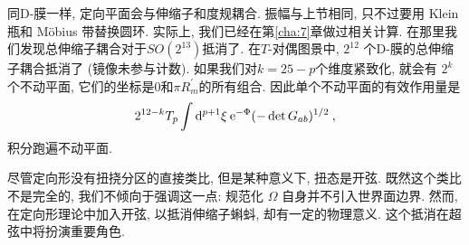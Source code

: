 同D-膜一样, 定向平面会与伸缩子和度规耦合. 振幅与上节相同, 只不过要用 Klein 瓶和 Möbius 带替换圆环. 
实际上, 我们已经在第\ref{cha:7}章做过相关计算. 在那里我们发现总伸缩子耦合对于$S O\left(2^{13}\right)$抵消了. 
在$T$-对偶图景中, $2^{12}$ 个D-膜的总伸缩子耦合抵消了 (镜像未参与计数). 如果我们对$k=25-p$个维度紧致化, 就会有 $2^{k}$个不动平面, 
它们的坐标是0和$\pi R_{m}^{\prime}$的所有组合. 因此单个不动平面的有效作用量是
\begin{equation}
	2^{12-k} T_{p} \int \mathrm{d}^{p+1} \xi \: \mathrm{e}^{-\Phi} (-\operatorname{det} G_{ab})^{1/2} \:, \label{8.8.5}
\end{equation}
积分跑遍不动平面.

尽管定向形没有扭挠分区的直接类比, 但是某种意义下, 扭态是开弦. 既然这个类比不是完全的, 我们不倾向于强调这一点: 
规范化 $\Omega$ 自身并不引入世界面边界. 然而, 在定向形理论中加入开弦, 以抵消伸缩子蝌蚪, 却有一定的物理意义. 这个抵消在超弦中将扮演重要角色.
